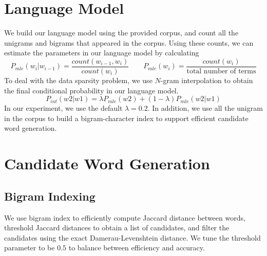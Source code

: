 
\usepackage{graphicx,amssymb,amsmath,enumerate}
\usepackage{courier}
\usepackage{color}
\usepackage{listings}
\usepackage{fancyvrb}
\usepackage{stmaryrd}

\oddsidemargin 0in
\evensidemargin 0in
\textwidth 6.5in
\topmargin -0.5in
\textheight 9.0in




\pagestyle{myheadings}  %

\section{Language Model}
We build our language model using the provided corpus, and count all the unigrams and bigrams that appeared in the corpus.
Using these counts, we can estimate the parameters in our language model by calculating
\begin{equation}\label{eq:1}
P_{mle}(w_i | w_{i-1}) = \frac{count(w_{i-1}, w_i)}{count(w_i)}
\qquad
P_{mle}(w_i) = \frac{count(w_i)}{\textrm{total number of terms}}
\end{equation}
To deal with the data sparsity problem, we use $N$-gram interpolation to obtain the final conditional probability in our language model.
\begin{equation}\label{eq:2}
P_{int}(w2 | w1) = \lambda P_{mle}(w2) + (1 - \lambda)P_{mle}(w2|w1)
\end{equation}
In our experiment, we use the default $\lambda = 0.2$.
In addition, we use all the unigram in the corpus to build a bigram-character index to support efficient candidate word generation.

\section{Candidate Word Generation}

\subsection{Bigram Indexing}
We use bigram index to efficiently compute Jaccard distance between words, threshold Jaccard distances to obtain a list of candidates, and filter the candidates using the exact Damerau-Levenshtein distance.
We tune the threshold parameter to be $0.5$ to balance between efficiency and accuracy.
